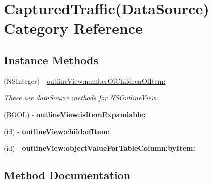 \hypertarget{category_captured_traffic_07_data_source_08}{}\section{Captured\+Traffic(Data\+Source) Category Reference}
\label{category_captured_traffic_07_data_source_08}
\subsection*{Instance Methods}
\begin{DoxyCompactItemize}
\item 
(N\+S\+Integer) -\/ \hyperlink{category_captured_traffic_07_data_source_08_a0acba96e0a2c8ffacfbb79fa7da8966b}{outline\+View\+:number\+Of\+Children\+Of\+Item\+:}
\begin{DoxyCompactList}\small\item\em These are data\+Source methods for N\+S\+Outline\+View. \end{DoxyCompactList}\item 
\mbox{\label{category_captured_traffic_07_data_source_08_a62ec426aa8a586c5c9ffabf399d964fe}} 
(B\+O\+OL) -\/ {\bfseries outline\+View\+:is\+Item\+Expandable\+:}
\item 
\mbox{\label{category_captured_traffic_07_data_source_08_a0f13201fd16c07b5ebe47c7a4bb843ab}} 
(id) -\/ {\bfseries outline\+View\+:child\+:of\+Item\+:}
\item 
\mbox{\label{category_captured_traffic_07_data_source_08_a447c2410e55e08847977062de9fcc513}} 
(id) -\/ {\bfseries outline\+View\+:object\+Value\+For\+Table\+Column\+:by\+Item\+:}
\end{DoxyCompactItemize}


\subsection{Method Documentation}
\mbox{\label{category_captured_traffic_07_data_source_08_a0acba96e0a2c8ffacfbb79fa7da8966b}} 
